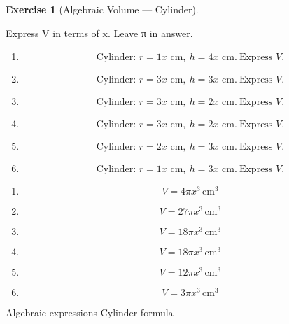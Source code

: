\documentclass[
  letterpaper,
  DIV=11,
  numbers=noendperiod]{scrreprt}
\theoremstyle{definition}
\newtheorem{exercise}{Exercise}[chapter]
\theoremstyle{remark}
\begin{document}
\begin{exercise}[Algebraic Volume ---
Cylinder]\protect\hypertarget{exr-alg-3}{}\label{exr-alg-3}

Express V in terms of x. Leave π in answer.

\begin{enumerate}
\def\labelenumi{\alph{enumi})}
\item
  \[\text{Cylinder: }r=1x\text{ cm},\ h=4x\text{ cm.}\ \text{Express }V.\]
\item
  \[\text{Cylinder: }r=3x\text{ cm},\ h=3x\text{ cm.}\ \text{Express }V.\]
\item
  \[\text{Cylinder: }r=3x\text{ cm},\ h=2x\text{ cm.}\ \text{Express }V.\]
\item
  \[\text{Cylinder: }r=3x\text{ cm},\ h=2x\text{ cm.}\ \text{Express }V.\]
\item
  \[\text{Cylinder: }r=2x\text{ cm},\ h=3x\text{ cm.}\ \text{Express }V.\]
\item
  \[\text{Cylinder: }r=1x\text{ cm},\ h=3x\text{ cm.}\ \text{Express }V.\]
\end{enumerate}

\begin{tcolorbox}[enhanced jigsaw, opacitybacktitle=0.6, coltitle=black, arc=.35mm, colframe=quarto-callout-tip-color-frame, colback=white, bottomrule=.15mm, left=2mm, colbacktitle=quarto-callout-tip-color!10!white, titlerule=0mm, opacityback=0, title=\textcolor{quarto-callout-tip-color}{\faLightbulb}\hspace{0.5em}{🔍 View Solution}, leftrule=.75mm, breakable, rightrule=.15mm, bottomtitle=1mm, toptitle=1mm, toprule=.15mm]

\begin{enumerate}
\def\labelenumi{\alph{enumi})}
\item
  \[V=4\pi x^3\,\text{cm}^{3}\]
\item
  \[V=27\pi x^3\,\text{cm}^{3}\]
\item
  \[V=18\pi x^3\,\text{cm}^{3}\]
\item
  \[V=18\pi x^3\,\text{cm}^{3}\]
\item
  \[V=12\pi x^3\,\text{cm}^{3}\]
\item
  \[V=3\pi x^3\,\text{cm}^{3}\]
\end{enumerate}

\end{tcolorbox}

{Algebraic expressions} {Cylinder formula}

\end{exercise}
\end{document}
